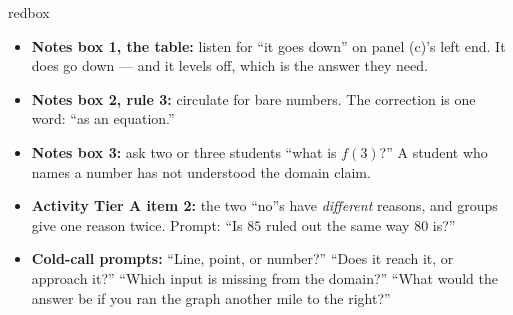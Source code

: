 \documentclass[10pt]{article}
\begin{document}
\begin{skillbox}{redbox}
\begin{itemize}[leftmargin=1.2em, itemsep=2pt, topsep=2pt]
  \item \textbf{Notes box 1, the table:} listen for ``it goes down'' on panel (c)'s left end. It does
        go down --- and it levels off, which is the answer they need.
  \item \textbf{Notes box 2, rule 3:} circulate for bare numbers. The correction is one word: ``as an
        equation.''
  \item \textbf{Notes box 3:} ask two or three students ``what is $f(3)$?'' A student who names a
        number has not understood the domain claim.
  \item \textbf{Activity Tier A item 2:} the two ``no''s have \emph{different} reasons, and groups
        give one reason twice. Prompt: ``Is $85$ ruled out the same way $80$ is?''
  \item \textbf{Cold-call prompts:} ``Line, point, or number?'' ``Does it reach it, or approach it?''
        ``Which input is missing from the domain?'' ``What would the answer be if you ran the graph
        another mile to the right?''
\end{itemize}
\end{skillbox}
\end{document}
